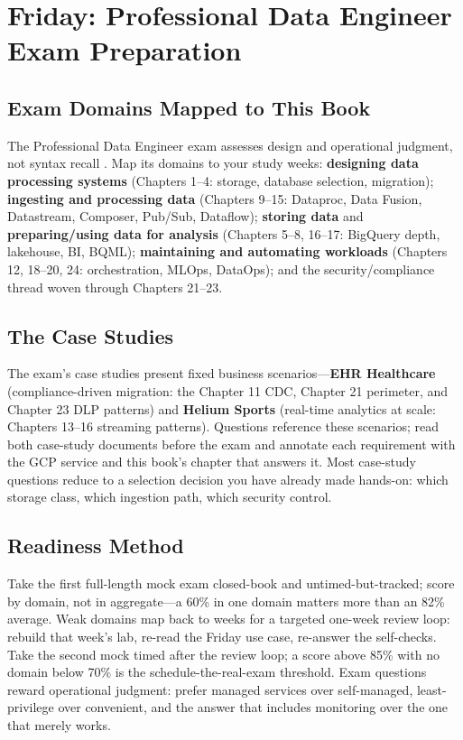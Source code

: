 \section{Friday: Professional Data Engineer Exam Preparation}

\subsection{Exam Domains Mapped to This Book}
The Professional Data Engineer exam assesses design and operational judgment, not syntax recall \cite{googlecloudpdeexam}. Map its domains to your study weeks: \textbf{designing data processing systems} (Chapters 1--4: storage, database selection, migration); \textbf{ingesting and processing data} (Chapters 9--15: Dataproc, Data Fusion, Datastream, Composer, Pub/Sub, Dataflow); \textbf{storing data} and \textbf{preparing/using data for analysis} (Chapters 5--8, 16--17: BigQuery depth, lakehouse, BI, BQML); \textbf{maintaining and automating workloads} (Chapters 12, 18--20, 24: orchestration, MLOps, DataOps); and the security/compliance thread woven through Chapters 21--23.

\subsection{The Case Studies}
The exam's case studies present fixed business scenarios---\textbf{EHR Healthcare} (compliance-driven migration: the Chapter 11 CDC, Chapter 21 perimeter, and Chapter 23 DLP patterns) and \textbf{Helium Sports} (real-time analytics at scale: Chapters 13--16 streaming patterns). Questions reference these scenarios; read both case-study documents before the exam and annotate each requirement with the GCP service and this book's chapter that answers it. Most case-study questions reduce to a selection decision you have already made hands-on: which storage class, which ingestion path, which security control.

\subsection{Readiness Method}
Take the first full-length mock exam closed-book and untimed-but-tracked; score by domain, not in aggregate---a 60\% in one domain matters more than an 82\% average. Weak domains map back to weeks for a targeted one-week review loop: rebuild that week's lab, re-read the Friday use case, re-answer the self-checks. Take the second mock timed after the review loop; a score above 85\% with no domain below 70\% is the schedule-the-real-exam threshold. Exam questions reward operational judgment: prefer managed services over self-managed, least-privilege over convenient, and the answer that includes monitoring over the one that merely works.

